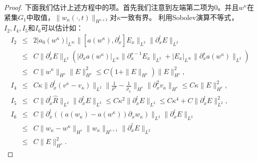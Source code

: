 \begin{proof}
下面我们估计上述方程中的项。首先我们注意到左端第二项为$0$。并且$w^\kappa$在紧集$G_1$中取值，$\|w_\kappa(\cdot, t)\|_{H^{s+2}}$对$\kappa$一致有界。 利用Sobolev演算不等式\cite{majda1984compressible}，$I_2, I_4, I_5$和$I_6$可以估计如：
\begin{eqnarray*}
  I_2 &\le& 2 |a_0(w^\kappa)|_{L^\infty} \|[a(w^\kappa),\partial^l_x]E_x\|_{L^2} \|\partial^l_x E\|_{L^2} \nonumber \\
  &\le& C \|\partial^l_x E\|_{L^2} (|\partial_x a(w^\kappa)|_{L^\infty}\|\partial^{s-1}_x E_x\|_{L^2} + |E_x|_{L^\infty} \|\partial^s_x a(w^\kappa)\|_{L^2})  \nonumber \\
  &\le& C \|w^\kappa\|_{H^s} \|E\|_{H^s}^2 \le C (1+\|E\|_{H^s}) \|E\|_{H^s}^2, \nonumber \\
  I_4 &\le&  C \kappa \|\partial^l_x (v^\kappa-v_\kappa)\|_{L^2} \|\frac{1}{\rho^\kappa}-\frac{1}{\rho_\kappa}\|_{H^s} \|\partial^2_x v_\kappa\|_{H^s}
  \le C \kappa \|E\|_{H^s}^2, \nonumber\\
  I_5 &\le& C \|\partial^l_x \hat{R}\|_{L^2} \|\partial^l_x E\|_{L^2} \le C\kappa^2\|\partial^l_x E\|_{L^2} \le C \kappa^4 + C \|\partial^l_x E\|_{L^2}^2, \nonumber \\
  I_6 &\le& C\|\partial^l_x ((a(w_\kappa)-a(w^\kappa))\partial_x w_\kappa)\|_{L^2} \|\partial^l_x E\|_{L^2}\nonumber\\
      &\le&  C \|w_\kappa-w^\kappa\|_{H^s} \|w_\kappa\|_{H^{s+1}} \|\partial^l_x E\|_{L^2} \nonumber\\
      &\le&  C \|E\|_{H^s}^2. \label{515}
\end{eqnarray*}


\end{proof}
